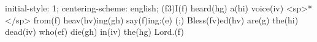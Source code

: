 initial-style: 1;
centering-scheme: english;
(f3)I(f) heard(hg) a(hi) voice(iv) <sp>*</sp> from(f) heav(hv)ing(gh) say(f)ing:(e) (;) Bless(fv)ed(hv) are(g) the(hi) dead(iv) who(ef) die(gh) in(iv) the(hg) Lord.(f)
